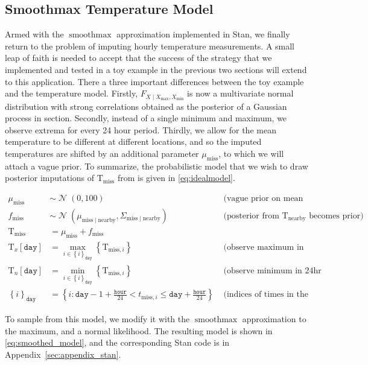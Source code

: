 \documentclass[letter]{article}
\def\lt{<}
\newcommand{\genericdel}[3]{%
      \left#1#3\right#2
    }
\newcommand{\del}[1]{\genericdel(){#1}}
\newcommand{\sbr}[1]{\genericdel[]{#1}}
\newcommand{\cbr}[1]{\genericdel\{\}{#1}}
\DeclareMathOperator{\normal}{\mathcal{N}}
\newcommand{\T}{\mathrm{T}}
\newcommand{\Tn}{\T_{n}}
\newcommand{\Tx}{\T_{x}}
\newcommand{\miss}{\mathrm{miss}}
\newcommand{\obs}{\mathrm{nearby}}
\newcommand{\hour}{\mathtt{hour}}
\DeclareMathOperator*{\softmax}{smoothmax}
\newcommand{\iday}{\mathtt{day}}
\newcommand{\dayset}[1]{\cbr{i}_{#1}}
\newcommand{\Xmax}{X_{\max}}
\newcommand{\Xmin}{X_{\min}}
\newcommand{\Fcond}{F_{X \mid \Xmax,\Xmin}}
\newcommand{\eqlabel}[1]{\label{#1}}
\begin{document}
        \subsection{Smoothmax Temperature Model}\label{smoothmax-temperature-model}

Armed with the \(\softmax\) approximation implemented in Stan, we finally return to the problem of imputing hourly temperature measurements.
A small leap of faith is needed to accept that the success of the strategy that we implemented and tested in a toy example in the previous two sections will extend to this application.
There a three important differences between the toy example and the temperature model.
Firstly, \(\Fcond\) is now a multivariate normal distribution with strong correlations obtained as the posterior of a Gaussian process in section.
Secondly, instead of a single minimum and maximum, we observe extrema for every 24 hour period.
Thirdly, we allow for the mean temperature to be different at different locations,
and so the imputed temperatures are shifted by an additional parameter \(\mu_{\miss}\),
to which we will attach a vague prior.
To summarize, the probabilistic model that we wish to draw posterior imputations of \(\T_\miss\) from is given in \eqref{eq:idealmodel}.

\begin{equation}
\eqlabel{eq:idealmodel}
\begin{aligned}
    \mu_{\miss} &\sim \normal\del{0,100} & \text{ (vague prior on mean temperature)} \\
    f_\miss &\sim \normal\del{\mu_{\miss \mid \obs}, \Sigma_{\miss \mid \obs}} & \text{ (posterior from $\T_\obs$ becomes prior)} \\
    \T_\miss &= \mu_\miss + f_\miss \\
    \Tx\sbr{\iday} &= \max_{i \in \dayset{\iday}}\cbr{ \T_{\miss,i}} & \text{ (observe maximum in 24hr window)}\\
    \Tn\sbr{\iday} &= \min_{i \in \dayset{\iday}}\cbr{ \T_{\miss,i}} & \text{ (observe minimum in 24hr window)}\\
    \dayset{\iday} &= \cbr{i : \iday-1+\frac{\hour}{24} \lt t_{\miss,i} \le \iday + \frac{\hour}{24}} & \text{ (indices of times in the 24hr window)}
\end{aligned}
\end{equation}
    


        To sample from this model, we modify it with the \(\softmax\) approximation to the maximum, and a normal likelihood. The resulting model is shown in \eqref{eq:smoothed_model}, and the corresponding Stan code is in Appendix~\ref{sec:appendix_stan}.
\end{document}
